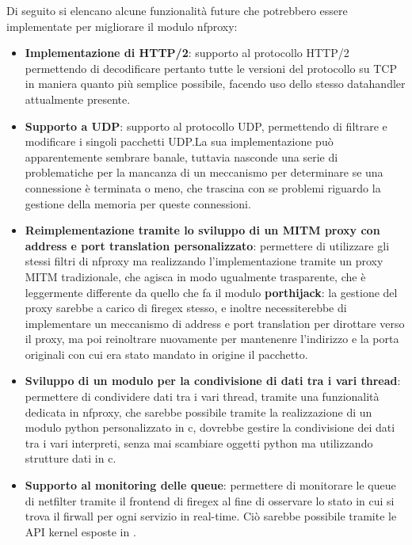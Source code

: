 Di seguito si elencano alcune funzionalità future che potrebbero essere implementate per migliorare il modulo nfproxy:

\begin{itemize}
    \setlength{\itemsep}{2pt}
    \setlength{\parskip}{2pt}
    \item \textbf{Implementazione di HTTP/2}: supporto al protocollo HTTP/2 permettendo di decodificare pertanto tutte le versioni del protocollo su TCP in maniera quanto più semplice possibile, facendo uso dello stesso datahandler attualmente presente.
    \item \textbf{Supporto a UDP}: supporto al protocollo UDP, permettendo di filtrare e modificare i singoli pacchetti UDP.\@ La sua implementazione può apparentemente sembrare banale, tuttavia nasconde una serie di problematiche per la mancanza di un meccanismo per determinare se una connessione è terminata o meno, che trascina con se problemi riguardo la gestione della memoria per queste connessioni.
    \item \textbf{Reimplementazione tramite lo sviluppo di un MITM proxy con address e port translation personalizzato}: permettere di utilizzare gli stessi filtri di nfproxy ma realizzando l'implementazione tramite un proxy MITM tradizionale, che agisca in modo ugualmente trasparente, che è leggermente differente da quello che fa il modulo \textbf{porthijack}: la gestione del proxy sarebbe a carico di firegex stesso, e inoltre necessiterebbe di implementare un meccanismo di address e port translation per dirottare verso il proxy, ma poi reinoltrare nuovamente per mantenenre l'indirizzo e la porta originali con cui era stato mandato in origine il pacchetto.
    \item \textbf{Sviluppo di un modulo per la condivisione di dati tra i vari thread}: permettere di condividere dati tra i vari thread, tramite una funzionalità dedicata in nfproxy, che sarebbe possibile tramite la realizzazione di un modulo python personalizzato in c, dovrebbe gestire la condivisione dei dati tra i vari interpreti, senza mai scambiare oggetti python ma utilizzando strutture dati in c.
    \item \textbf{Supporto al monitoring delle queue}: permettere di monitorare le queue di netfilter tramite il frontend di firegex al fine di osservare lo stato in cui si trova il firwall per ogni servizio in real-time. Ciò sarebbe possibile tramite le API kernel esposte in .
\end{itemize}
